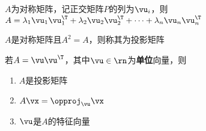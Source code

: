 \begin{theorem}[谱分解]
$A$为对称矩阵，记正交矩阵$P$的列为$\vu_i$，则$A=\lambda_1\vu_1\vu_1^\T +\lambda_2\vu_2\vu_2^\T +\cdots+\lambda_n\vu_n\vu_n^\T $
\end{theorem}
\begin{definition}[投影矩阵]
$A$是对称矩阵且$A^2=A$，则称其为投影矩阵
\end{definition}
\begin{proposition}
若$A=\vu\vu^\T $，其中$\vu\in\rn$为\textbf{单位}向量，则
\begin{enumerate}
	\itemsep -3pt
	\item $A$是投影矩阵
	\item $A\vx=\opproj_{\vu}\vx$
	\item $\vu$是$A$的特征向量
\end{enumerate}
\end{proposition}

